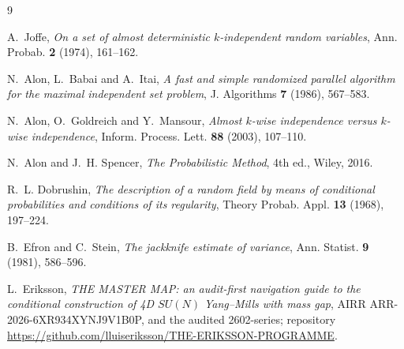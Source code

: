 \documentclass[11pt]{article}
\theoremstyle{remark}
\begin{document}
\begin{thebibliography}{9}\small

A.~Joffe,
\emph{On a set of almost deterministic $k$-independent random
variables},
Ann. Probab. \textbf{2} (1974), 161--162.

N.~Alon, L.~Babai and A.~Itai,
\emph{A fast and simple randomized parallel algorithm for the maximal
independent set problem},
J. Algorithms \textbf{7} (1986), 567--583.

N.~Alon, O.~Goldreich and Y.~Mansour,
\emph{Almost $k$-wise independence versus $k$-wise independence},
Inform. Process. Lett. \textbf{88} (2003), 107--110.

N.~Alon and J.~H. Spencer,
\emph{The Probabilistic Method},
4th ed., Wiley, 2016.

R.~L. Dobrushin,
\emph{The description of a random field by means of conditional
probabilities and conditions of its regularity},
Theory Probab. Appl. \textbf{13} (1968), 197--224.

B.~Efron and C.~Stein,
\emph{The jackknife estimate of variance},
Ann. Statist. \textbf{9} (1981), 586--596.

L.~Eriksson,
\emph{THE MASTER MAP: an audit-first navigation guide to the
conditional construction of 4D $SU(N)$ Yang--Mills with mass gap},
AIRR ARR-2026-6XR934XYNJ9V1B0P, and the audited 2602-series;
repository \url{https://github.com/lluiseriksson/THE-ERIKSSON-PROGRAMME}.

\end{thebibliography}
\end{document}
